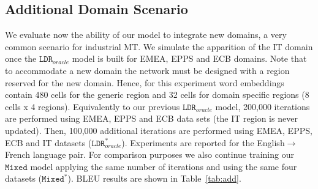 \documentclass[a4paper]{article}
\begin{document}
\begin{table}[!h]
\begin{center}
\end{center}
\caption{BLEU scores for the Transformer architecture for varying domain-specific embedding sizes \label{tab:embedding-size}}
\end{table}

\subsection{Additional Domain Scenario \label{ssec:additiona_domain}}

We evaluate now the ability of our model to integrate new domains, a very common scenario for industrial MT.
We simulate the apparition of the IT domain once the $\mathtt{LDR}_{oracle}$ model is built for EMEA, EPPS and ECB domains.
Note that to accommodate a new domain the network must be designed with a region reserved for the new domain.
Hence, for this experiment word embeddings contain 480 cells for the generic region and 32 cells for domain specific regions (8 cells x 4 regions).
Equivalently to our previous $\mathtt{LDR}_{oracle}$ model, 200,000 iterations are performed using EMEA, EPPS and ECB data sets (the IT region is never updated).
Then, 100,000 additional iterations are performed using  EMEA, EPPS, ECB and IT datasets ($\mathtt{LDR}_{oracle}^*$).
Experiments are reported for the English$\rightarrow$French language pair.
For comparison purposes we also continue training our $\mathtt{Mixed}$ model applying the same number of iterations and using the same four datasets ($\mathtt{Mixed}^*$).
BLEU results are shown in Table~\ref{tab:add}.
\end{document}
